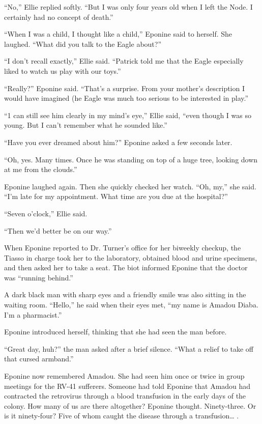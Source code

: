 \documentclass[]{article}
\begin{document}
{“No,” Ellie replied softly.  “But I was only four years old when I left the Node.  I certainly had no concept of death.”

“When I was a child, I thought like a child,” Eponine said to herself.  She laughed.  “What did you talk to the Eagle about?”

“I don’t recall exactly,” Ellie said.  “Patrick told me that the Eagle especially liked to watch us play with our toys.”

“Really?” Eponine said.  “That’s a surprise.  From your mother’s description I would have imagined (he Eagle was much too serious to be interested in play.”

“1 can still see him clearly in my mind’s eye,” Ellie said, “even though I was so young.  But I can’t remember what he sounded like.”

“Have you ever dreamed about him?” Eponine asked a few seconds later.

“Oh, yes.  Many times.  Once he was standing on top of a huge tree, looking down at me from the clouds.”

Eponine laughed again.  Then she quickly checked her watch.  “Oh, my,” she said.  “I’m late for my appointment.  What time are you due at the hospital?”

“Seven o’clock,” Ellie said.

“Then we’d better be on our way.”

When Eponine reported to Dr.  Turner’s office for her biweekly checkup, the Tiasso in charge took her to the laboratory, obtained blood and urine specimens, and then asked her to take a seat.  The biot informed Eponine that the doctor was “running behind.”

A dark black man with sharp eyes and a friendly smile was also sitting in the waiting room.  “Hello,” he said when their eyes met, “my name is Amadou Diaba.  I’m a pharmacist.”

Eponine introduced herself, thinking that she had seen the man before.

“Great day, huh?” the man asked after a brief silence.  “What a relief to take off that cursed armband.”

Eponine now remembered Amadou.  She had seen him once or twice in group meetings for the RV-41 sufferers.  Someone had told Eponine that Amadou had contracted the retrovirus through a blood transfusion in the early days of the colony.  How many of us are there altogether? Eponine thought.  Ninety-three.  Or is it ninety-four? Five of whom caught the disease through a transfusion… .

}
\end{document}
